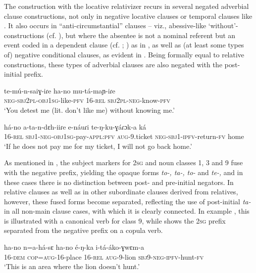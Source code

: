 \documentclass[output=paper,colorlinks,citecolor=brown,draftmode]{langscibook}
\begin{document}
The construction with the locative relativizer recurs in several negated adverbial clause constructions, not only in negative locative clauses or temporal clauses like . It also occurs in “anti-circumstantial” clauses – viz., abessive-like ‘without’-constructions (cf. ), but where the absentee is not a nominal referent but an event coded in a dependent clause (cf. \citealt{MauriSansò2019}; \citealt{BernanderEtAl2023a}) as in , as well as (at least some types of) negative conditional clauses, as evident in . Being formally equal to relative constructions, these types of adverbial clauses are also negated with the post-initial prefix.

\ea\label{ex:ngo:49} 
    \gll te-mú-n-saiɣ{}-iɾe ha-no mu-tá-maɲ{}-iɾe\\ 
        \textsc{neg-sbj}2\textsc{pl-obj}1\textsc{sg}{}-like-\textsc{pfv} 16-\textsc{rel} \textsc{sbj}2\textsc{pl}{}-\textsc{neg}{}-know-\textsc{pfv}\\
    \glt ‘You detest me (lit. don’t like me) without knowing me.’
\z 

\ea\label{ex:ngo:50} 
    \gll há-no a-ta-n-dɛh-iiɾe e-náuɾi te-ŋ{}-ku-ɣáɾɔk-a ká\\ 
    16-\textsc{rel} \textsc{sbj}1-\textsc{neg}{}-\textsc{obj}1\textsc{sg}{}-pay-\textsc{appl:pfv} \textsc{aug-}9.ticket \textsc{neg-sbj}1-\textsc{ipfv}{}-return-\textsc{fv} home \\
    \glt ‘If he does not pay me for my ticket, I will not go back home.’
\z 

As mentioned in , the subject markers for 2\textsc{sg} and noun classes 1, 3 and 9 fuse with the negative prefix, yielding the opaque forms \textit{to-, ta-, to-} and \textit{te-,} and in these cases there is no distinction between post- and pre-initial negators. In relative clauses as well as in other subordinate clauses derived from relatives, however, these fused forms become separated, reflecting the use of post-initial \textit{ta-} in all non-main clause cases, with which it is clearly connected. In example , this is illustrated with a canonical verb for class 9, while  shows the 2\textsc{sg} prefix separated from the negative prefix on a copula verb.

\ea\label{ex:ngo:51} 
    \gll ha-no n=a-há-sɛ ha-no é{}-ŋ-ka i-tá-áko-ɣwɛm-a\\ 
    16-\textsc{dem} \textsc{cop=aug-16}{}-place 16\textsc{{}-rel} \textsc{aug}{}-9-lion \textsc{sbj9-neg-ipfv}{}-hunt-\textsc{fv}\\
    \glt ‘This is an area where the lion doesn’t hunt.’
\z 
\end{document}
